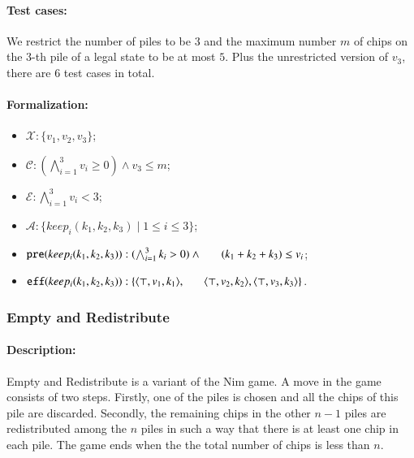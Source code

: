 \documentclass[review]{elsarticle}
\newcommand{\set}[1]{\{ #1 \}}
\newcommand{\tuple}[1]{\langle {#1} \rangle}
\newcommand{\true}{\top}
\newcommand{\statevar}{\mathcal{X}}
\newcommand{\act}{\mathcal{A}}
\newcommand{\constraint}{\mathcal{C}}
\newcommand{\estate}{\mathcal{E}}
\newcommand{\pre}{\mathtt{pre}}
\newcommand{\eff}{\mathtt{eff}}
\begin{document}
\paragraph{Test cases:}
We restrict the number of piles to be $3$ and the maximum number $m$ of chips on the $3$-th pile of a legal state to be at most $5$. 
Plus the unrestricted version of $v_3$, there are $6$ test cases in total.

\paragraph{Formalization:}

\begin{itemize}
	\item $\statevar: \set{v_1, v_2, v_3}$;
	\item $\constraint: (\bigwedge_{i=1}^{3} v_i \ge 0) \wedge v_3 \le m$;
	\item $\estate: \bigwedge_{i=1}^{3} v_i < 3$;
	
	\item $\act:\set{keep_i(k_1, k_2, k_3){\mid}1\le i \le 3}$;
	\item $\pre(keep_i(k_1, k_2, k_3)) : (\bigwedge_{i=1}^{3} k_i > 0) \wedge \\ \hspace*{6mm}
	(k_1 + k_2 +k_3)\le v_i $;
	\item $\eff(keep_i(k_1, k_2, k_3)) : \set{\tuple{\true, v_1, k_1}, \\ \hspace*{6mm}
		\tuple{\true, v_2, k_2},\tuple{\true, v_3, k_3}}$.
	
	
\end{itemize}


\subsubsection{Empty and Redistribute \protect\cite{Fer1998}}
\paragraph{Description:} 
Empty and Redistribute is a variant of the Nim game. 
A move in the game consists of two steps. 
Firstly, one of the piles is chosen and all the chips of this pile are discarded. 
Secondly, the remaining chips in the other $n-1$ piles are redistributed among the $n$ piles in such a way that there is at least one chip in each pile. 
The game ends when the the total number of chips is less than $n$.
\end{document}
